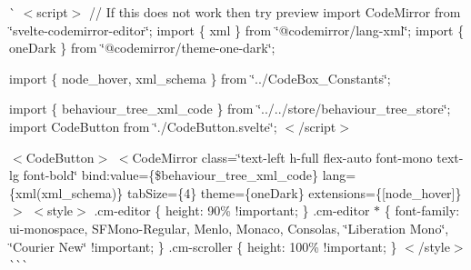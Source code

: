 \`{} $<$script$>$ // If this does not work then try preview import Code\+Mirror from \char`\"{}svelte-\/codemirror-\/editor\char`\"{}; import \{ xml \} from \char`\"{}@codemirror/lang-\/xml\char`\"{}; import \{ one\+Dark \} from \char`\"{}@codemirror/theme-\/one-\/dark\char`\"{};

import \{ node\+\_\+hover, xml\+\_\+schema \} from \char`\"{}../\+Code\+Box\+\_\+\+Constants\char`\"{};

import \{ behaviour\+\_\+tree\+\_\+xml\+\_\+code \} from \char`\"{}../../store/behaviour\+\_\+tree\+\_\+store\char`\"{}; import Code\+Button from \char`\"{}./\+Code\+Button.\+svelte\char`\"{}; $<$/script$>$

 $<$\+Code\+Button$>$ $<$\+Code\+Mirror         class=\char`\"{}text-\/left h-\/full flex-\/auto font-\/mono text-\/lg font-\/bold\char`\"{}         bind\+:value=\{\$behaviour\+\_\+tree\+\_\+xml\+\_\+code\}         lang=\{xml(xml\+\_\+schema)\}         tab\+Size=\{4\}         theme=\{one\+Dark\}         extensions=\{\mbox{[}node\+\_\+hover\mbox{]}\}     $>$ $<$style$>$ .cm-\/editor \{ height\+: 90\% !important; \} .cm-\/editor $\ast$ \{ font-\/family\+: ui-\/monospace, SFMono-\/\+Regular, Menlo, Monaco, Consolas, \char`\"{}\+Liberation Mono\char`\"{}, \char`\"{}\+Courier New\char`\"{} !important; \} .cm-\/scroller \{ height\+: 100\% !important; \} $<$/style$>$  \`{}\`{}\`{} 
